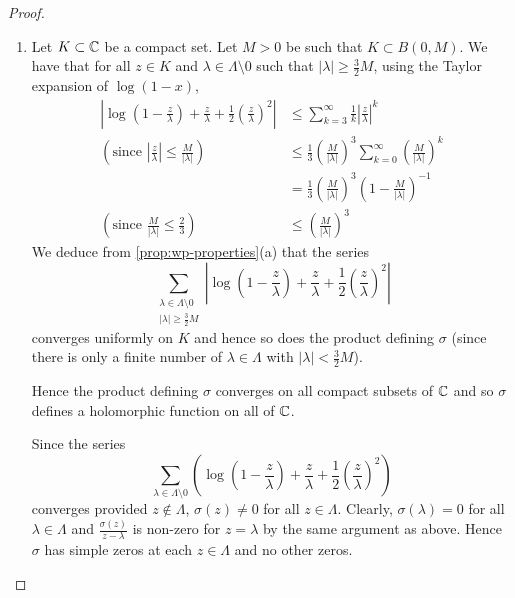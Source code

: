 \begin{proof}	
	\begin{enumerate}[label=(\alph*)]
		\item Let $K \subset \mathbb{C}$ be a compact set.
			Let $M > 0$ be such that $K \subset B(0, M)$.
			We have that for all $z \in K$ and
			$\lambda \in \Lambda\setminus 0$ such that
			$|\lambda| \geq \frac{3}{2}M$,
			using the Taylor expansion of $\log(1 - x)$,
			\begin{align*}
				\left|\log\left(1 - \frac{z}{\lambda}\right) +
				\frac{z}{\lambda} + \frac{1}{2}\left(
				\frac{z}{\lambda}\right)^2\right|
				&\leq \sum_{k = 3}^\infty
				\frac{1}{k}\left|\frac{z}{\lambda}\right|^k\\
				\left(\textrm{since $\left|\frac{z}{\lambda}\right|
					\leq \frac{M}{|\lambda|}$}
				\right)\qquad
				&\leq \frac{1}{3}\left(\frac{M}{|\lambda|}\right)^3
				\sum_{k = 0}^\infty\left(\frac{M}{|\lambda|}\right)^k\\
				&= \frac{1}{3}\left(\frac{M}{|\lambda|}\right)^3
				\left(1 - \frac{M}{|\lambda|}\right)^{-1}\\
				\left(\textrm{since $\frac{M}{|\lambda|} \leq \frac{2}{3}$}
				\right)\qquad
				&\leq \left(\frac{M}{|\lambda|}\right)^3
			\end{align*}
			We deduce from \ref{prop:wp-properties}(a) that the series
			\begin{equation*}
				\sum_{\substack{
					\lambda \in \Lambda\setminus 0\\
					|\lambda| \geq \frac{3}{2}M}}
				\left|\log\left(1 - \frac{z}{\lambda}\right) +
				\frac{z}{\lambda} + \frac{1}{2}\left(
				\frac{z}{\lambda}\right)^2\right|
			\end{equation*}
			converges uniformly on $K$
			and hence so does the product defining $\sigma$ 
			(since there is only a finite number of $\lambda \in \Lambda$ with
			$|\lambda| < \frac{3}{2}M$).

			Hence the product defining $\sigma$ converges on all compact subsets
			of $\mathbb{C}$ and so $\sigma$ defines a holomorphic function
			on all of $\mathbb{C}$.
			
			Since the series
			\begin{equation*}
				\sum_{\lambda \in \Lambda\setminus 0}
				\left(\log\left(1 - \frac{z}{\lambda}\right) +
				\frac{z}{\lambda} + \frac{1}{2}\left(
			\frac{z}{\lambda}\right)^2\right)
			\end{equation*}
			converges provided $z \notin \Lambda$, $\sigma(z) \neq 0$ for all
			$z \in \Lambda$. Clearly, $\sigma(\lambda) = 0$ for all
			$\lambda \in \Lambda$ and $\frac{\sigma(z)}{z - \lambda}$ is non-zero
			for $z = \lambda$ by the same argument as above. Hence $\sigma$
			has simple zeros at each $z \in \Lambda$ and no other zeros.


\end{enumerate}
\end{proof}

